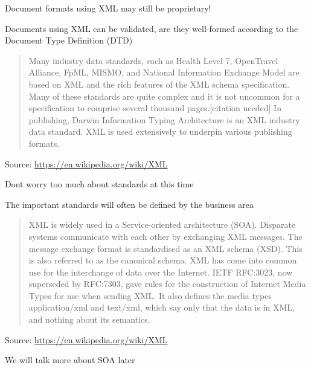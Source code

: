 \documentclass[Screen16to9,17pt]{foils}
\begin{document}
\begin{list2}
\item Document formats using XML may still be proprietary!
\item Documents using XML can be validated, are they well-formed according to the Document Type Definition (DTD)
\end{list2}


\begin{quote}
Many industry data standards, such as Health Level 7, OpenTravel Alliance, FpML, MISMO, and National Information Exchange Model are based on XML and the rich features of the XML schema specification. Many of these standards are quite complex and it is not uncommon for a specification to comprise several thousand pages.[citation needed] In publishing, Darwin Information Typing Architecture is an XML industry data standard. XML is used extensively to underpin various publishing formats.
\end{quote}
Source: \url{https://en.wikipedia.org/wiki/XML}

\begin{list2}
\item Dont worry too much about standards at this time
\item The important standards will often be defined by the business area
\end{list2}



\begin{quote}
XML is widely used in a Service-oriented architecture (SOA). Disparate systems communicate with each other by exchanging XML messages. The message exchange format is standardised as an XML schema (XSD). This is also referred to as the canonical schema. XML has come into common use for the interchange of data over the Internet. IETF RFC:3023, now superseded by RFC:7303, gave rules for the construction of Internet Media Types for use when sending XML. It also defines the media types application/xml and text/xml, which say only that the data is in XML, and nothing about its semantics.
\end{quote}
Source: \url{https://en.wikipedia.org/wiki/XML}

\begin{list2}
\item We will talk more about SOA later
\end{list2}
\end{document}
